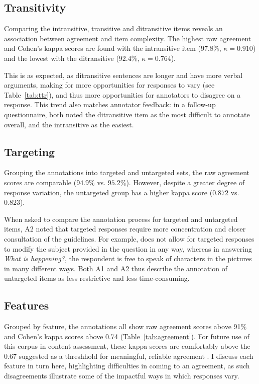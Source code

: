 \subsection{Transitivity} 
\label{sec:transitivity}
Comparing the intransitive, transitive and ditransitive items reveals an association between agreement and item complexity. The highest raw agreement and Cohen's kappa scores are found with the intransitive item ($97.8\%$, $\kappa=0.910$) and the lowest with the ditransitive ($92.4\%$, $\kappa=0.764$). 

This is as expected, as ditransitive sentences are longer and have more verbal arguments, making for more opportunities for responses to vary (see Table~\ref{tab:ttr}), and thus more opportunities for annotators to disagree on a response. This trend also matches annotator feedback: in a follow-up questionnaire, both noted the ditransitive item as the most difficult to annotate overall, and the intransitive as the easiest.

\subsection{Targeting} 
\label{sec:prompts}
Grouping the annotations into targeted and untargeted sets, the raw agreement scores are comparable ($94.9\%$ vs. $95.2\%$). However, despite a greater degree of response variation, the untargeted group has a higher kappa score ($0.872$ vs. $0.823$).

When asked to compare the annotation process for targeted and untargeted items, A2 noted that targeted responses require more concentration and closer consultation of the guidelines. For example,  does not allow for targeted responses to modify the subject provided in the question in any way, whereas in answering \textit{What is happening?}, the respondent is free to speak of characters in the pictures in many different ways.  Both A1 and A2 thus describe the annotation of untargeted items as less restrictive and less time-consuming.

\subsection{Features} 
\label{sec:features}
Grouped by feature, the annotations all show raw agreement scores above 91\% and Cohen's kappa scores above 0.74 (Table~\ref{tab:agreement}). For future use of this corpus in content assessment, these kappa scores are comfortably above the 0.67 suggested as a threshhold for meaningful, reliable agreement \citep{landis1977measurement, artstein:massimo:2008}.  I discuss each feature in turn here, highlighting difficulties in coming to an agreement, as such disagreements illustrate some of the impactful ways in which responses vary.

